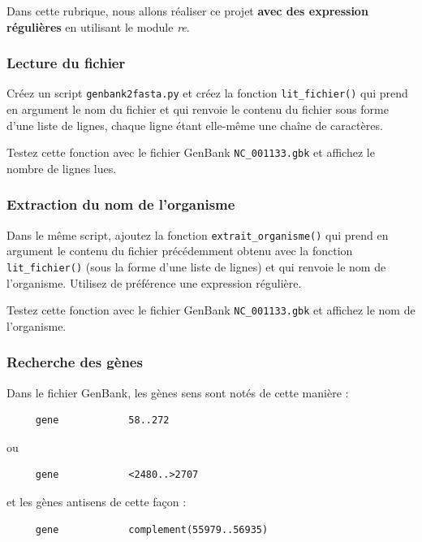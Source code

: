 \documentclass[a4paper,11pt,twoside]{book}
\begin{document}
Dans cette rubrique, nous allons réaliser ce projet \textbf{avec des
expression régulières} en utilisant le module \emph{re}.

\subsubsection{Lecture du fichier}\label{lecture-du-fichier-1}

Créez un script \texttt{genbank2fasta.py} et créez la fonction
\texttt{lit\_fichier()} qui prend en argument le nom du fichier et qui
renvoie le contenu du fichier sous forme d'une liste de lignes, chaque
ligne étant elle-même une chaîne de caractères.

Testez cette fonction avec le fichier GenBank \texttt{NC\_001133.gbk} et
affichez le nombre de lignes lues.

\subsubsection{Extraction du nom de
l'organisme}\label{extraction-du-nom-de-lorganisme-1}

Dans le même script, ajoutez la fonction \texttt{extrait\_organisme()}
qui prend en argument le contenu du fichier précédemment obtenu avec la
fonction \texttt{lit\_fichier()} (sous la forme d'une liste de lignes)
et qui renvoie le nom de l'organisme. Utilisez de préférence une
expression régulière.

Testez cette fonction avec le fichier GenBank \texttt{NC\_001133.gbk} et
affichez le nom de l'organisme.

\subsubsection{Recherche des gènes}\label{recherche-des-guxe8nes-1}

Dans le fichier GenBank, les gènes sens sont notés de cette manière :

\begin{verbatim}
     gene            58..272
\end{verbatim}

ou

\begin{verbatim}
     gene            <2480..>2707
\end{verbatim}

et les gènes antisens de cette façon :

\begin{verbatim}
     gene            complement(55979..56935)
\end{verbatim}
\end{document}
